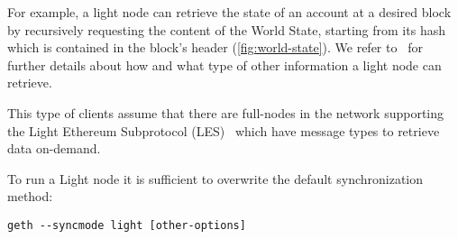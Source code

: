 For example, a light node can retrieve the state of an account at a desired
block by recursively requesting the content of the World State, starting from
its hash which is contained in the block's header (\autoref{fig:world-state}).
We refer to~\cite{bib:light-client} for further details about how and what type
of other information a light node can retrieve.

This type of clients assume that there are full-nodes in the network supporting
the Light Ethereum Subprotocol (LES)~\cite{bib:les-protocol} which have message
types to retrieve data on-demand.

To run a Light node it is sufficient to overwrite the default synchronization
method:
\begin{center}
    \verb|geth --syncmode light [other-options]|
\end{center}
